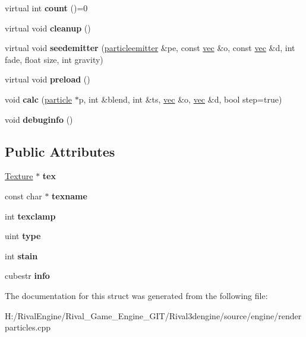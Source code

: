 \begin{DoxyCompactItemize}
virtual int {\bfseries count} ()=0
\item 
\mbox{\label{structpartrenderer_a53a28b21b1033f7de7159e8ffb7e8a9b}} 
virtual void {\bfseries cleanup} ()
\item 
\mbox{\label{structpartrenderer_a80ec6cff6b1da2558c05f43495965c44}} 
virtual void {\bfseries seedemitter} (\hyperlink{structparticleemitter}{particleemitter} \&pe, const \hyperlink{structvec}{vec} \&o, const \hyperlink{structvec}{vec} \&d, int fade, float size, int gravity)
\item 
\mbox{\label{structpartrenderer_a6c26b8b3e5ee1cb9fc9c2ec801fc927a}} 
virtual void {\bfseries preload} ()
\item 
\mbox{\label{structpartrenderer_aedbefb3166587748ba59e48b1234ad84}} 
void {\bfseries calc} (\hyperlink{structparticle}{particle} $\ast$p, int \&blend, int \&ts, \hyperlink{structvec}{vec} \&o, \hyperlink{structvec}{vec} \&d, bool step=true)
\item 
\mbox{\label{structpartrenderer_a823e079c3019150c0d9c1dbd73ab0c6b}} 
void {\bfseries debuginfo} ()
\end{DoxyCompactItemize}
\subsection*{Public Attributes}
\begin{DoxyCompactItemize}
\item 
\mbox{\label{structpartrenderer_a270e048f0aba8cdbc33274246bafa695}} 
\hyperlink{struct_texture}{Texture} $\ast$ {\bfseries tex}
\item 
\mbox{\label{structpartrenderer_a5b69dc613efe9c87c7b0d52b177bfd4b}} 
const char $\ast$ {\bfseries texname}
\item 
\mbox{\label{structpartrenderer_a19f8eacdc076297a4d93ef0450fca0a2}} 
int {\bfseries texclamp}
\item 
\mbox{\label{structpartrenderer_a61b40697a16b77b058f412d03ed81c3f}} 
uint {\bfseries type}
\item 
\mbox{\label{structpartrenderer_aa693daf20449d2a991e052fd0227475a}} 
int {\bfseries stain}
\item 
\mbox{\label{structpartrenderer_abd9c1f34a7477acf91dc30ff46349605}} 
cubestr {\bfseries info}
\end{DoxyCompactItemize}


The documentation for this struct was generated from the following file\+:\begin{DoxyCompactItemize}
\item 
H\+:/\+Rival\+Engine/\+Rival\+\_\+\+Game\+\_\+\+Engine\+\_\+\+G\+I\+T/\+Rival3dengine/source/engine/renderparticles.\+cpp\end{DoxyCompactItemize}
